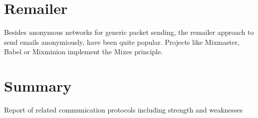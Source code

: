 \section{Remailer}
Besides anonymous networks for generic packet sending, the remailer approach
to send emails anonymiously, have been quite popular.
Projects like Mixmaster\cite{mixmaster}, 
Babel\cite{babel} or Mixminion\cite{mixminion} implement
the Mixes principle\cite{Chaum:1981:UEM:358549.358563}.
\section{Summary}
Report of related communication protocols including strength and weaknesses
